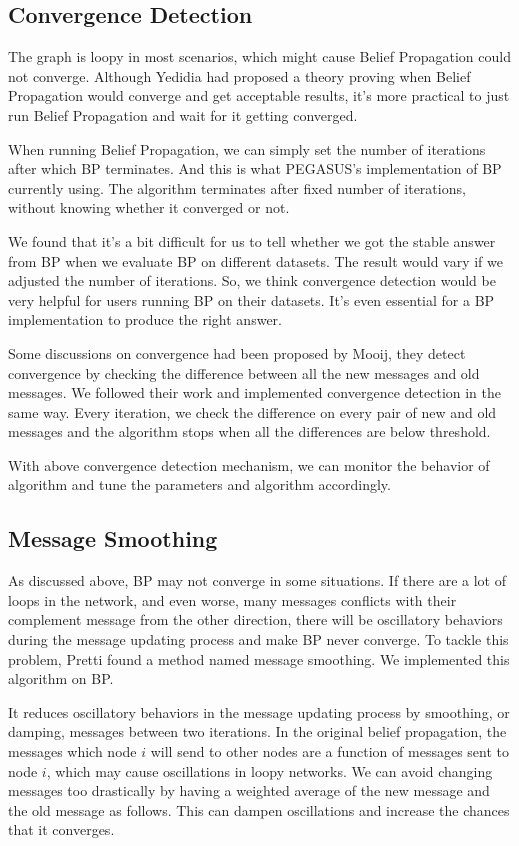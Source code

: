 \subsection{Convergence Detection}

The graph is loopy in most scenarios, which might cause Belief Propagation could not converge. Although Yedidia had proposed a theory proving when Belief Propagation would converge and get acceptable results, it’s more practical to just run Belief Propagation and wait for it getting converged.

When running Belief Propagation, we can simply set the number of iterations after which BP terminates. And this is what PEGASUS’s implementation of BP currently using. The algorithm terminates after fixed number of iterations, without knowing whether it converged or not.

We found that it’s a bit difficult for us to tell whether we got the stable answer from BP when we evaluate BP on different datasets. The result would vary if we adjusted the number of iterations. So, we think convergence detection would be very helpful for users running BP on their datasets. It’s even essential for a BP implementation to produce the right answer.

Some discussions on convergence had been proposed by Mooij, they detect convergence by checking the difference between all the new messages and old messages. We followed their work and implemented convergence detection in the same way. Every iteration, we check the difference on every pair of new and old messages and the algorithm stops when all the differences are below threshold.

With above convergence detection mechanism, we can monitor the behavior of algorithm and tune the parameters and algorithm accordingly.

\subsection{Message Smoothing}

As discussed above, BP may not converge in some situations. If there are a lot of loops in the network, and even worse, many messages conflicts with their complement message from the other direction, there will be oscillatory behaviors during the message updating process and make BP never converge. To tackle this problem, Pretti found a method named message smoothing. We implemented this algorithm on BP.

It reduces oscillatory behaviors in the message updating process by smoothing, or damping, messages between two iterations. In the original belief propagation, the messages which node $i$ will send to other nodes are a function of messages sent to node $i$, which may cause oscillations in loopy networks. We can avoid changing messages too drastically by having a weighted average of the new message and the old message as follows. This can dampen oscillations and increase the chances that it converges.

